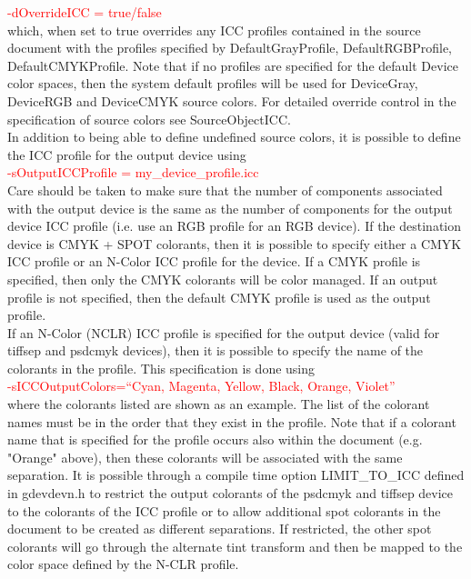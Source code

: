 \documentclass[12pt,notitlepage]{article}
\begin{document}
 \textcolor{red}{-dOverrideICC = true/false}\\

\noindent which, when set to true overrides any ICC profiles contained in the source document with the profiles specified by DefaultGrayProfile, DefaultRGBProfile, DefaultCMYKProfile. Note that if no profiles are specified for the default Device color spaces, then the system default profiles will be used for DeviceGray, DeviceRGB and DeviceCMYK source colors. For detailed override control in the specification of source colors see SourceObjectICC.\\

In addition to being able to define undefined source colors, it is possible to define the ICC profile for the output device using\\

\textcolor{red}{-sOutputICCProfile = my\_device\_profile.icc}\\

 \noindent Care should be taken to make sure that the number of components associated with the output device is the same as the number of components for the output device ICC profile (i.e. use an RGB profile for an RGB device).  If the destination device is CMYK + SPOT colorants, then it is possible to specify either a CMYK ICC profile or an N-Color ICC profile for the device.  If a CMYK profile is specified, then only the CMYK colorants will be color managed.  If an output profile is not specified, then the default CMYK profile is used as the output profile.\\

 If an N-Color (NCLR) ICC profile is specified for the output device (valid for tiffsep and psdcmyk devices), then it is possible to specify the name of the colorants in the profile.   This specification is done using\\

\textcolor{red}{-sICCOutputColors=``Cyan, Magenta, Yellow, Black, Orange, Violet''}\\

 \noindent where the colorants listed are shown as an example.  The list of the colorant names must be in the order that they exist in the profile.  Note that if a colorant name that is specified for the profile occurs also within the document (e.g. "Orange" above), then these colorants will be associated with the same separation. It is possible through a compile time option LIMIT\_TO\_ICC defined in gdevdevn.h to restrict the output colorants of the psdcmyk and tiffsep device to the colorants of the ICC profile or to allow additional spot colorants in the document to be created as different separations. If restricted, the other spot colorants will go through the alternate tint transform and then be mapped to the color space defined by the N-CLR profile.\\
\end{document}
